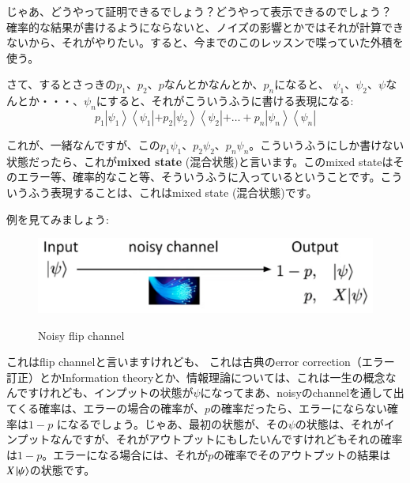じゃあ、どうやって証明できるでしょう？どうやって表示できるのでしょう？
確率的な結果が書けるようにならないと、ノイズの影響とかではそれが計算できないから、それがやりたい。すると、今までのこのレッスンで喋っていた外積を使う。

さて、するとさっきの$p_1$、$p_2$、$p$なんとかなんとか、$p_n$になると、
$\psi_1$、$\psi_2$、$\psi$なんとか・・・、$\psi_n$にすると、それがこういうふうに書ける表現になる:
\begin{equation}
p_{1}\left|\psi_{1}\right\rangle\left\langle\psi_{1}\left|+p_{2}\right| \psi_{2}\right\rangle\left\langle\psi_{2}\left|+\ldots+p_{n}\right| \psi_{n}\right\rangle\left\langle\psi_{n}\right|
\end{equation}

これが、一緒なんですが、この$p_1\psi_1$、$p_2\psi_2$、$p_n\psi_n$。こういうふうにしか書けない状態だったら、これが\textbf{mixed state} (混合状態)と言います。このmixed stateはそのエラー等、確率的なこと等、そういうふうに入っているということです。こういうふう表現することは、これはmixed state (混合状態)です。

例を見てみましょう:
\begin{figure}[H]
    \centering
    \includegraphics[width=1.0\textwidth]{lesson3/noisy_channel_bit_flip.pdf}
    \label{fig: 1}
    \begin{center}
        \caption{Noisy flip channel}
    \end{center}
\end{figure}

これはflip channelと言いますけれども、
これは古典のerror correction（エラー訂正）とかInformation theoryとか、情報理論については、これは一生の概念なんですけれども、インプットの状態が$\psi$になってまあ、noisyのchannelを通して出てくる確率は、エラーの場合の確率が、$p$の確率だったら、エラーにならない確率は$1-p$ になるでしょう。じゃあ、最初の状態が、その$\psi$の状態は、それがインプットなんですが、それがアウトプットにもしたいんですけれどもそれの確率は$1-p$。エラーになる場合には、それが$p$の確率でそのアウトプットの結果は $X\ket{\psi}$の状態です。

